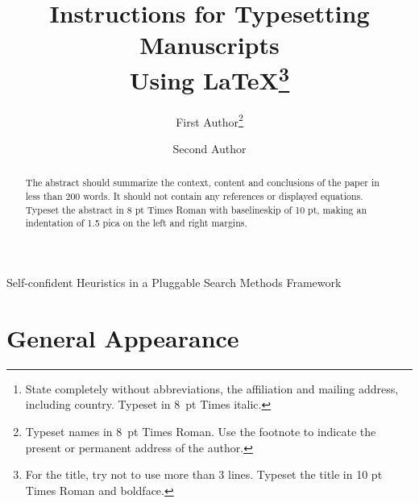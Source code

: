 \documentclass{ws-ijait}
\begin{document}
{Self-confident Heuristics in a Pluggable Search Methods Framework}

%
\catchline{}{}{}{}{}
%

\title{Instructions for Typesetting Manuscripts\\
Using \LaTeX\footnote{For the title, try not to use more than
3 lines. Typeset the title in 10 pt Times Roman and
boldface.}
}

\author{First Author\footnote{
Typeset names in 8~pt Times Roman. Use the footnote
to indicate the present or permanent address of the author.}}

\address{University Department, University Name, Address\\
City, State ZIP/Zone,
Country\footnote{State completely without abbreviations, the
affiliation and mailing address, including country. Typeset in 8~pt
Times italic.}\\
first\_author@university.edu}

\author{Second Author}

\address{Group, Laboratory, Address\\
City, State ZIP/Zone, Country\\
second\_author@group.com}

\maketitle

\begin{history}
\end{history}

\begin{abstract}
The abstract should summarize the context, content
and conclusions of the paper in less than 200 words. It should
not contain any references or displayed equations. Typeset the
abstract in 8 pt Times Roman with baselineskip of 10 pt, making
an indentation of 1.5 pica on the left and right margins.
\end{abstract}


\section{General Appearance}	
\end{document}
